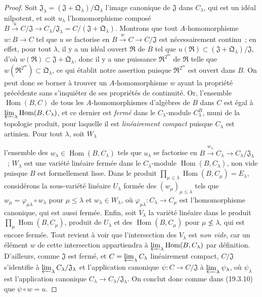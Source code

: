 \begin{proof}
Soit $\mathfrak J_\lambda=(\mathfrak J+\mathfrak Q_\lambda)/\mathfrak Q_\lambda$
l'image canonique de $\mathfrak J$ dans $C_\lambda$, qui est un idéal
nilpotent, et soit $u_\lambda$ l'homomorphisme composé
$B\xrightarrow{u}C/\mathfrak J\to C_\lambda/\mathfrak J_\lambda
=C/(\mathfrak J+\mathfrak Q_\lambda)$. Montrons que tout
$A$-homomorphisme $w:B\to C$ tel que $u$ se factorise en
$B\xrightarrow{w}C\to C/\mathfrak J$ est nécessairement continu~; en
effet, pour tout $\lambda$, il y a un idéal ouvert $\mathfrak R$ de $B$
tel que $u(\mathfrak R)\subset
(\mathfrak J+\mathfrak Q_\lambda)/\mathfrak J$, d'où
$w(\mathfrak R)\subset\mathfrak J+\mathfrak Q_\lambda$, donc il y a
une puissance $\mathfrak R^{2^m}$ de $\mathfrak R$ telle que
$w(\mathfrak R^{2^m})\subset\mathfrak Q_\lambda$, ce qui établit
notre assertion puisque $\mathfrak R^{2^m}$ est ouvert dans $B$. On peut
donc se borner à trouver un $A$-homomorphisme $w$ ayant la propriété précédente
sans s'inquiéter de ses propriétés de continuité. Or, l'ensemble
$\operatorname{Hom}(B,C)$ de tous les $A$-homomorphismes d'algèbres de $B$
dans $C$ est égal à
$\varprojlim_\lambda\operatorname{Hom}(B,C_\lambda)$, et ce dernier est
\emph{fermé} dans le $C_\lambda$-module $C_\lambda^B$, muni de la topologie
produit, pour laquelle il est \emph{linéairement compact} puisque
  $C_\lambda$ est artinien. Pour tout $\lambda$, soit $W_\lambda$


l'ensemble des $w_\lambda\in\operatorname{Hom}(B,C_\lambda)$ tels que
$u_\lambda$ se factorise en
$B\xrightarrow{w_\lambda}C_\lambda\to
C_\lambda/\mathfrak J_\lambda$~; $W_\lambda$ est une variété
linéaire fermée dans le $C_\lambda$-module
  $\operatorname{Hom}(B,C_\lambda)$, non vide puisque $B$ est formellement
  lisse. Dans le produit
$\prod_{\mu\leq\lambda}\operatorname{Hom}(B,C_\mu)=E_\lambda$,
considérons la sous-variété linéaire $U_\lambda$ formée des
$(w_\mu)_{\mu\leq\lambda}$ tels que
$w_\mu=\varphi_{\mu\lambda}\circ w_\lambda$ pour
$\mu\leq\lambda$ et $w_\lambda\in W_\lambda$, où
$\varphi_{\mu\lambda}:C_\lambda\to C_\mu$ est
l'homomorphisme canonique, qui est aussi fermée. Enfin, soit $V_\lambda$
la variété linéaire dans le produit
$\prod_\mu\operatorname{Hom}(B,C_\mu)$, produit de $U_\lambda$
et des $\operatorname{Hom}(B,C_\mu)$ pour
$\mu\not\leq\lambda$, qui est encore fermée. Tout revient à voir que
l'intersection des $V_\lambda$ est \emph{non vide}, car un élément $w$ de
cette intersection appartiendra à
$\varprojlim_\lambda\operatorname{Hom}(B,C_\lambda)$ par définition.
D'ailleurs, comme $\mathfrak J$ est fermé, et
$C=\varprojlim_\lambda C_\lambda$ linéairement compact,
$C/\mathfrak J$ s'identifie à
$\varprojlim_\lambda C_\lambda/\mathfrak J_\lambda$ et
l'application canonique $\psi:C\to C/\mathfrak J$ à
$\varprojlim_\lambda\psi_\lambda$, où $\psi_\lambda$ est
l'application canonique
$C_\lambda\to C_\lambda/\mathfrak J_\lambda$. On conclut donc
comme dans (19.3.10) que $\psi\circ w=u$.
\end{proof}

